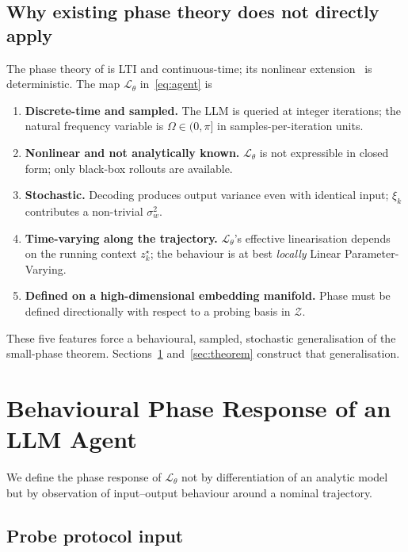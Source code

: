 \documentclass[11pt,a4paper]{article}
\theoremstyle{definition}
\theoremstyle{remark}
\newcommand{\embspace}{\mathcal{Z}}
\newcommand{\agent}{\mathcal{L}_{\theta}}
\begin{document}
\subsection{Why existing phase theory does not directly apply}\label{ssec:why-not}

The phase theory of \citet{Chen2023PhaseTheory} is LTI and continuous-time;
its nonlinear extension~\citep{Chen2021PhaseNonlinear} is
deterministic.  The map $\agent$ in~\eqref{eq:agent} is

\begin{enumerate}[leftmargin=*,label=(\roman*)]
\item \textbf{Discrete-time and sampled.}  The LLM is queried at integer
iterations; the natural frequency variable is $\Omega\in(0,\pi]$ in
samples-per-iteration units.
\item \textbf{Nonlinear and not analytically known.}  $\agent$ is not
expressible in closed form; only black-box rollouts are available.
\item \textbf{Stochastic.}  Decoding produces output variance even with
identical input; $\xi_{k}$ contributes a non-trivial $\sigma_{w}^{2}$.
\item \textbf{Time-varying along the trajectory.}  $\agent$'s effective
linearisation depends on the running context $z_{k}^{\star}$; the
behaviour is at best \emph{locally} Linear Parameter-Varying.
\item \textbf{Defined on a high-dimensional embedding manifold.}  Phase
must be defined directionally with respect to a probing basis in
$\embspace$.
\end{enumerate}

These five features force a behavioural, sampled, stochastic
generalisation of the small-phase theorem.  Sections~\ref{sec:behavioural-phase}
and~\ref{sec:theorem} construct that generalisation.

\section{Behavioural Phase Response of an LLM Agent}\label{sec:behavioural-phase}

We define the phase response of $\agent$ not by differentiation of an
analytic model but by observation of input--output behaviour around a
nominal trajectory.

\subsection{Probe protocol input}\label{ssec:probe-input}
\end{document}
